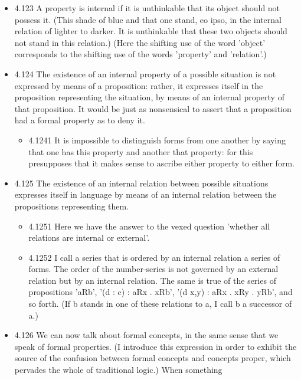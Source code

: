 \documentclass[11pt]{article}
\begin{document}
\begin{itemize}
\begin{itemize}
\end{itemize}
\item 4.123
\label{sec:org4098d01}
A property is internal if it is unthinkable that its object should
not possess it. (This shade of blue and that one stand, eo ipso, in the
internal relation of lighter to darker. It is unthinkable that these two
objects should not stand in this relation.) (Here the shifting use of the
word 'object' corresponds to the shifting use of the words 'property' and
'relation'.)
\item 4.124
\label{sec:org9e7110e}
The existence of an internal property of a possible situation is not
expressed by means of a proposition: rather, it expresses itself in the
proposition representing the situation, by means of an internal property of
that proposition. It would be just as nonsensical to assert that a
proposition had a formal property as to deny it.
\begin{itemize}
\item 4.1241
\label{sec:org0f7f6aa}
It is impossible to distinguish forms from one another by saying
that one has this property and another that property: for this presupposes
that it makes sense to ascribe either property to either form.
\end{itemize}
\item 4.125
\label{sec:org5128ddf}
The existence of an internal relation between possible situations
expresses itself in language by means of an internal relation between the
propositions representing them.
\begin{itemize}
\item 4.1251
\label{sec:orge257550}
Here we have the answer to the vexed question 'whether all relations
are internal or external'.
\item 4.1252
\label{sec:org4a0c737}
I call a series that is ordered by an internal relation a series of
forms. The order of the number-series is not governed by an external
relation but by an internal relation. The same is true of the series of
propositions 'aRb', '(d : c) : aRx . xRb', '(d x,y) : aRx . xRy . yRb', and
so forth. (If b stands in one of these relations to a, I call b a successor
of a.)
\end{itemize}
\item 4.126
\label{sec:org3689b6f}
We can now talk about formal concepts, in the same sense that we
speak of formal properties. (I introduce this expression in order to
exhibit the source of the confusion between formal concepts and concepts
proper, which pervades the whole of traditional logic.) When something

\end{itemize}
\end{document}
